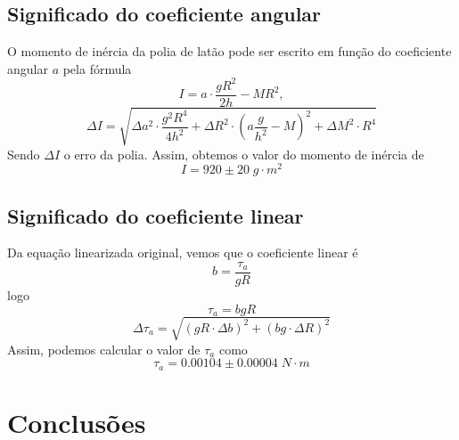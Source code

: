 \documentclass[12pt,a4paper]{article}
\begin{document}
\subsection{Significado do coeficiente angular}
O momento de inércia da polia de latão pode ser escrito em função do coeficiente angular $a$ pela fórmula 
$$I = a\cdot\frac{gR^2}{2h}-MR^2,$$
$$\Delta I = \sqrt{\Delta a^2 \cdot \frac{g^2R^4}{4h^2} + \Delta R^2 \cdot (a\frac{g}{h^2} - M)^2 + \Delta M^2\cdot R^4}$$
Sendo $\Delta I$ o erro da polia.
Assim, obtemos o valor do momento de inércia de 
$$ I = 920 \pm 20 \; g \cdot m^2 $$ 

\subsection{Significado do coeficiente linear}
Da equação linearizada original, vemos que o coeficiente linear é 
$$ b = \frac{\tau_a}{gR} $$
logo 
$$ \tau_a = bgR $$
$$ \Delta \tau_a = \sqrt{(gR \cdot \Delta b)^2 + (bg \cdot \Delta R)^2} $$
Assim, podemos calcular o valor de $\tau_a$ como 
$$ \tau_a =  0.00104 \pm 0.00004 \; N \cdot m $$

\section{Conclusões}
\end{document}
